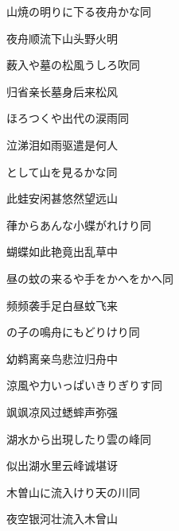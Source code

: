 \begin{haiku}
    {\FH 山焼の明りに下る夜舟かな}\hfill{\FH 同}

    {\FK 夜舟顺流下山头野火明}
\end{haiku}

\begin{haiku}
    {\FH 薮入や墓の松風うしろ吹}\hfill{\FH 同}

    {\FK 归省亲长墓身后来松风}
\end{haiku}

\begin{haiku}
    {\FH ほろつくや出代の涙雨}\hfill{\FH 同}

    {\FK 泣涕泪如雨驱遣是何人}
\end{haiku}

\begin{haiku}
    {\FH {}として山を見るかな}\hfill{\FH 同}

    {\FK 此蛙安闲甚悠然望远山}
\end{haiku}

\begin{haiku}
    {\FH 葎からあんな小蝶がれけり}\hfill{\FH 同}

    {\FK 蝴蝶如此艳竟出乱草中}
\end{haiku}

\begin{haiku}
    {\FH 昼の蚊の来るや手をかへをかへ}\hfill{\FH 同}

    {\FK 频频袭手足白昼蚊飞来}
\end{haiku}

\begin{haiku}
    {\FH {}の子の鳴舟にもどりけり}\hfill{\FH 同}

    {\FK 幼鹈离亲鸟悲泣归舟中}
\end{haiku}

\begin{haiku}
    {\FH 涼風や力いっぱいきりぎりす}\hfill{\FH 同}

    {\FK 飒飒凉风过蟋蟀声弥强}
\end{haiku}

\begin{haiku}
    {\FH 湖水から出現したり雲の峰}\hfill{\FH 同}

    {\FK 似出湖水里云峰诚堪讶}
\end{haiku}

\begin{haiku}
    {\FH 木曽山に流入けり天の川}\hfill{\FH 同}

    {\FK 夜空银河壮流入木曾山}
\end{haiku}

